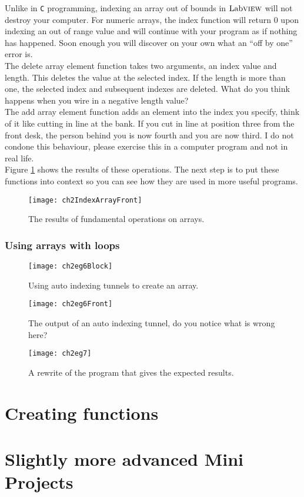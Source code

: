 Unlike in \texttt{C} programming, indexing an array out of bounds in $\text{Lab}\textsc{view}$ will not destroy your computer. For numeric arrays, the index function will return $0$ upon indexing an out of range value and will continue with your program as if nothing has happened. Soon enough you will discover on your own what an ``off by one'' error is.\\

The delete array element function takes two arguments, an index value and length. This deletes the value at the selected index. If the length is more than one, the selected index and subsequent indexes are deleted. What do you think happens when you wire in a negative length value?\\ %

The add array element function adds an element into the index you specify, think of it like cutting in line at the bank. If you cut in line at position three from the front desk, the person behind you is now fourth and you are now third. I do not condone this behaviour, please exercise this in a computer program and not in real life.\\

Figure \ref{ch2IndexArrayFront} shows the results of these operations. The next step is to put these functions into context so you can see how they are used in more useful programs.\\
\begin{figure}
	\centering
	\texttt{[image: ch2IndexArrayFront]}
	\caption{The results of fundamental operations on arrays.}
	\label{ch2IndexArrayFront}
\end{figure}

\subsubsection{Using arrays with loops}
\begin{figure}
	\centering
	\texttt{[image: ch2eg6Block]}
	\caption{Using auto indexing tunnels to create an array.}
	\label{ch2eg6Block}
\end{figure}
\begin{figure}
	\centering
	\texttt{[image: ch2eg6Front]}
	\caption{The output of an auto indexing tunnel, do you notice what is wrong here?}
	\label{ch2eg6Front}
\end{figure}


\begin{figure}
	\centering
	\texttt{[image: ch2eg7]}
	\caption{A rewrite of the program that gives the expected results.}
	\label{ch2eg7}
\end{figure}
\section{Creating functions}

\section{Slightly more advanced Mini Projects}